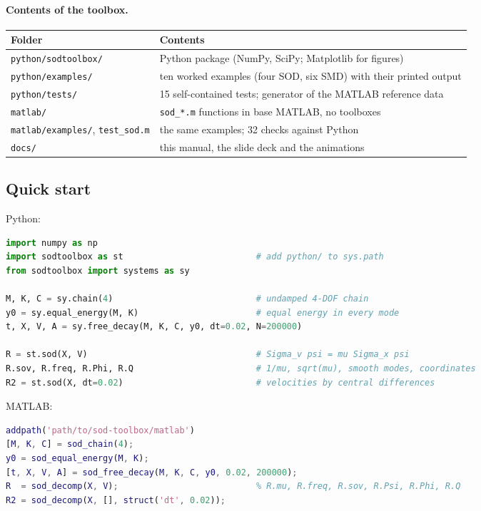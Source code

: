 \documentclass[report]{nld}
\newcommand{\code}[1]{\texttt{#1}}
\begin{document}
\paragraph{Contents of the toolbox.}
\begin{center}\small
\begin{tabularx}{\linewidth}{@{}>{\raggedright}p{4.3cm}X@{}}
\toprule
Folder & Contents\\
\midrule
\code{python/sodtoolbox/} & Python package (NumPy, SciPy; Matplotlib for figures)\\
\code{python/examples/} & ten worked examples (four SOD, six SMD) with their printed output\\
\code{python/tests/} & 15 self-contained tests; generator of the MATLAB reference data\\
\code{matlab/} & \code{sod\_*.m} functions in base MATLAB, no toolboxes\\
\code{matlab/examples/}, \code{test\_sod.m} & the same examples; 32 checks against Python\\
\code{docs/} & this manual, the slide deck and the animations\\
\bottomrule
\end{tabularx}
\end{center}

\subsection{Quick start}

Python:
\begin{lstlisting}[language=Python]
import numpy as np
import sodtoolbox as st                          # add python/ to sys.path
from sodtoolbox import systems as sy

M, K, C = sy.chain(4)                            # undamped 4-DOF chain
y0 = sy.equal_energy(M, K)                       # equal energy in every mode
t, X, V, A = sy.free_decay(M, K, C, y0, dt=0.02, N=200000)

R = st.sod(X, V)                                 # Sigma_v psi = mu Sigma_x psi
R.sov, R.freq, R.Phi, R.Q                        # 1/mu, sqrt(mu), smooth modes, coordinates
R2 = st.sod(X, dt=0.02)                          # velocities by central differences
\end{lstlisting}
MATLAB:
\begin{lstlisting}[language=Matlab]
addpath('path/to/sod-toolbox/matlab')
[M, K, C] = sod_chain(4);
y0 = sod_equal_energy(M, K);
[t, X, V, A] = sod_free_decay(M, K, C, y0, 0.02, 200000);
R  = sod_decomp(X, V);                           % R.mu, R.freq, R.sov, R.Psi, R.Phi, R.Q
R2 = sod_decomp(X, [], struct('dt', 0.02));
\end{lstlisting}
\end{document}
